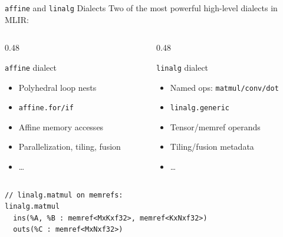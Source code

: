 \begin{frame}[fragile]{\texttt{affine} and \texttt{linalg} Dialects}
  Two of the most powerful high-level dialects in MLIR:
  \begin{columns}
    \begin{column}{0.48\textwidth}
      \begin{block}{\texttt{affine} dialect}
        {\small
        \begin{itemize}
          \item Polyhedral loop nests
          \item \texttt{affine.for/if}
          \item Affine memory accesses
          \item Parallelization, tiling, fusion
          \item \ldots
        \end{itemize}
        }
      \end{block}
    \end{column}
    \begin{column}{0.48\textwidth}
      \begin{exampleblock}{\texttt{linalg} dialect}
        {\small
        \begin{itemize}
          \item Named ops: \texttt{matmul/conv/dot}
          \item \texttt{linalg.generic}
          \item Tensor/memref operands
          \item Tiling/fusion metadata
          \item \ldots
        \end{itemize}
        }
      \end{exampleblock}
    \end{column}
  \end{columns}

  \bigskip
\begin{lstlisting}[language=none,basicstyle=\ttfamily\small]
// linalg.matmul on memrefs:
linalg.matmul
  ins(%A, %B : memref<MxKxf32>, memref<KxNxf32>)
  outs(%C : memref<MxNxf32>)
\end{lstlisting}
\end{frame}


